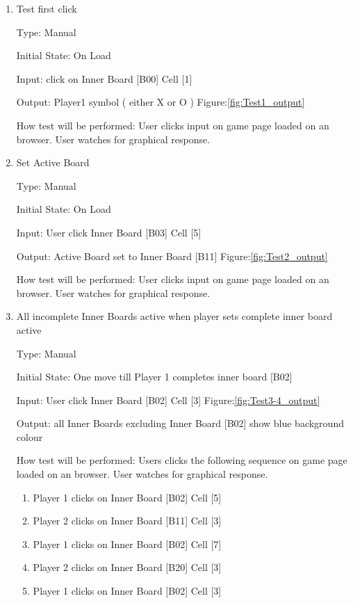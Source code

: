 \documentclass[12pt, titlepage]{article}
\begin{document}
\begin{enumerate}

\item{Test first click\\}

Type: Manual
					
Initial State: On Load
					
Input: click on Inner Board [B00] Cell [1] 
					
Output: Player1 symbol ( either X or O ) Figure:\ref{fig:Test1_output}
					
How test will be performed: User clicks input on game page loaded on an
browser. User watches for graphical response.

\item{Set Active Board\\}

Type: Manual
					
Initial State: On Load
					
Input: User click Inner Board [B03] Cell [5] 
					
Output:  Active Board set to Inner Board [B11] Figure:\ref{fig:Test2_output}
					
How test will be performed: User clicks input on game page loaded on an
browser. User watches for graphical response.


\item{All incomplete Inner Boards active when player sets complete inner board active \\}

Type: Manual
					
Initial State: One move till Player 1 completes inner board [B02]
					
Input: User click Inner Board [B02] Cell [3] Figure:\ref{fig:Test3-4_output}
					
Output:  all Inner Boards excluding Inner Board [B02] show blue background colour
					
How test will be performed: Users clicks the following sequence on game page
loaded on an browser. User watches for graphical response.
\begin{enumerate}
	\item Player 1 clicks on Inner Board [B02] Cell [5]
	\item Player 2 clicks on Inner Board [B11] Cell [3]
	\item Player 1 clicks on Inner Board [B02] Cell [7]
	\item Player 2 clicks on Inner Board [B20] Cell [3]
	\item Player 1 clicks on Inner Board [B02] Cell [3]
\end{enumerate}



\end{enumerate}
\end{document}
